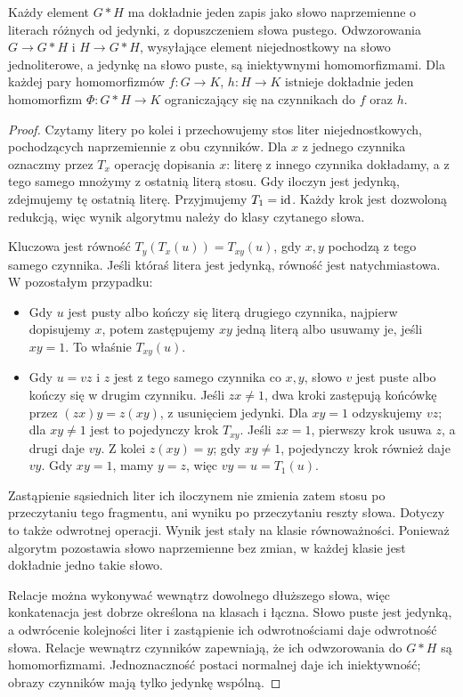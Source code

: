 \begin{stwierdzenie}
\label{prop:free-product-normal-5}
Każdy element $G*H$ ma dokładnie jeden zapis jako słowo
naprzemienne o literach różnych od jedynki, z dopuszczeniem
słowa pustego. Odwzorowania $G\to G*H$ i $H\to G*H$,
wysyłające element niejednostkowy na słowo jednoliterowe,
a jedynkę na słowo puste, są iniektywnymi homomorfizmami.
Dla każdej pary homomorfizmów $f:G\to K$, $h:H\to K$
istnieje dokładnie jeden homomorfizm $\Phi:G*H\to K$
ograniczający się na czynnikach do $f$ oraz $h$.
\end{stwierdzenie}
\begin{proof}
Czytamy litery po kolei i przechowujemy stos liter
niejednostkowych, pochodzących naprzemiennie z obu czynników.
Dla $x$ z jednego czynnika oznaczmy przez $T_x$ operację
dopisania $x$: literę z innego czynnika dokładamy, a z tego
samego mnożymy z ostatnią literą stosu. Gdy iloczyn jest
jedynką, zdejmujemy tę ostatnią literę. Przyjmujemy $T_1=\mathrm{id}$.
Każdy krok jest dozwoloną redukcją, więc wynik algorytmu
należy do klasy czytanego słowa.

Kluczowa jest równość $T_y(T_x(u))=T_{xy}(u)$, gdy $x,y$
pochodzą z tego samego czynnika. Jeśli któraś litera jest
jedynką, równość jest natychmiastowa. W pozostałym przypadku:
\begin{itemize}[leftmargin=*]
\item Gdy $u$ jest pusty albo kończy się literą drugiego
czynnika, najpierw dopisujemy $x$, potem zastępujemy $xy$
jedną literą albo usuwamy je, jeśli $xy=1$. To właśnie $T_{xy}(u)$.
\item Gdy $u=vz$ i $z$ jest z tego samego czynnika co $x,y$,
słowo $v$ jest puste albo kończy się w drugim czynniku.
Jeśli $zx\ne1$, dwa kroki zastępują końcówkę przez
$(zx)y=z(xy)$, z usunięciem jedynki. Dla $xy=1$ odzyskujemy $vz$;
dla $xy\ne1$ jest to pojedynczy krok $T_{xy}$.
Jeśli $zx=1$, pierwszy krok usuwa $z$, a drugi daje $vy$.
Z kolei $z(xy)=y$; gdy $xy\ne1$, pojedynczy krok również daje $vy$.
Gdy $xy=1$, mamy $y=z$, więc $vy=u=T_1(u)$.
\end{itemize}
Zastąpienie sąsiednich liter ich iloczynem nie zmienia zatem
stosu po przeczytaniu tego fragmentu, ani wyniku po przeczytaniu
reszty słowa. Dotyczy to także odwrotnej operacji.
Wynik jest stały na klasie równoważności. Ponieważ algorytm
pozostawia słowo naprzemienne bez zmian, w każdej klasie jest
dokładnie jedno takie słowo.

Relacje można wykonywać wewnątrz dowolnego dłuższego słowa,
więc konkatenacja jest dobrze określona na klasach i łączna.
Słowo puste jest jedynką, a odwrócenie kolejności liter
i zastąpienie ich odwrotnościami daje odwrotność słowa.
Relacje wewnątrz czynników zapewniają, że ich odwzorowania
do $G*H$ są homomorfizmami. Jednoznaczność postaci normalnej
daje ich iniektywność; obrazy czynników mają tylko jedynkę wspólną.


\end{proof}
